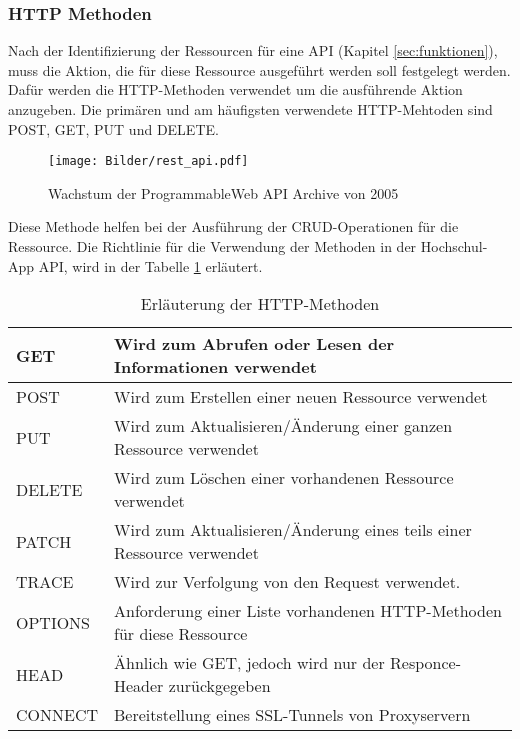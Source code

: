 \subsubsection{HTTP Methoden}
Nach der Identifizierung der Ressourcen für eine API (Kapitel \ref{sec:funktionen}), muss die Aktion, die für diese Ressource ausgeführt werden soll festgelegt werden. Dafür werden die HTTP-Methoden verwendet um die ausführende Aktion anzugeben. Die primären und am häufigsten verwendete HTTP-Mehtoden sind POST, GET, PUT und DELETE. 

\begin{figure}[H]
\centering
\texttt{[image: Bilder/rest\_api.pdf]}
\caption{Wachstum der ProgrammableWeb API Archive von 2005\label{fig:api}}
\end{figure}

Diese Methode helfen bei der Ausführung der CRUD-Operationen für die Ressource. Die Richtlinie für die Verwendung der Methoden in der Hochschul-App API, wird in der Tabelle \ref{tab:httpmethoden} erläutert.

\begin{table}[H]
\begin{center}
  \begin{tabular}{| l | l |}
    \hline
    GET		 									& Wird zum Abrufen oder Lesen der Informationen verwendet 
    \\ \hline
    POST									 		& Wird zum Erstellen einer neuen Ressource verwendet
    \\ \hline
    PUT									 		& Wird zum Aktualisieren/Änderung einer ganzen Ressource verwendet
    \\ \hline
    DELETE								 		& Wird zum Löschen einer vorhandenen Ressource verwendet
    \\ \hline
    PATCH								 		& Wird zum Aktualisieren/Änderung eines teils einer Ressource verwendet
    \\ \hline
    TRACE										& Wird zur Verfolgung von den Request verwendet.
    \\ \hline
    OPTIONS								 		& Anforderung einer Liste vorhandenen HTTP-Methoden für diese Ressource
    \\ \hline
    HEAD											& Ähnlich wie GET, jedoch wird nur der Responce-Header zurückgegeben
    \\ \hline
    CONNECT										& Bereitstellung eines SSL-Tunnels von Proxyservern %
    \\ \hline
  \end{tabular}
  \end{center}
\caption[HTTP-Methoden]{Erläuterung der HTTP-Methoden}
\label{tab:httpmethoden}
\end{table}

